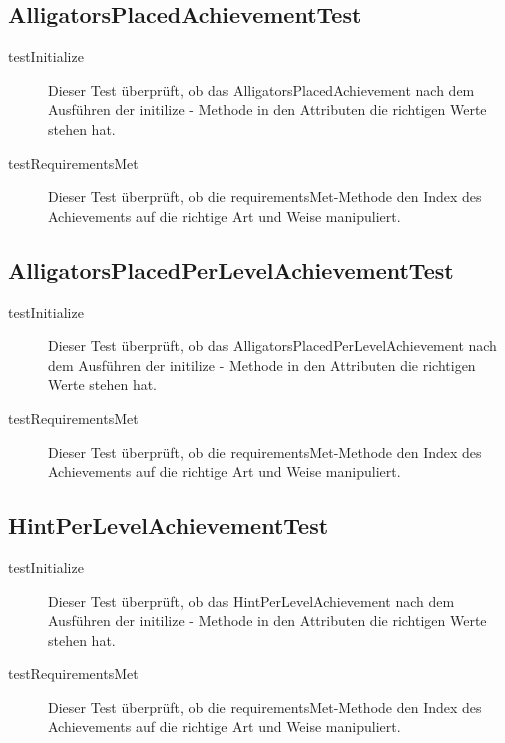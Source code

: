 \subsection{AlligatorsPlacedAchievementTest}

\begin{description}
\item[testInitialize]
Dieser Test überprüft, ob das AlligatorsPlacedAchievement nach dem Ausführen der initilize - Methode in den Attributen die richtigen Werte stehen hat.

\item[testRequirementsMet]
Dieser Test überprüft, ob die requirementsMet-Methode den Index des Achievements auf die richtige Art und Weise manipuliert.

\end{description}

\subsection{AlligatorsPlacedPerLevelAchievementTest}

\begin{description}
\item[testInitialize]
Dieser Test überprüft, ob das AlligatorsPlacedPerLevelAchievement nach dem Ausführen der initilize - Methode in den Attributen die richtigen Werte stehen hat.

\item[testRequirementsMet]
Dieser Test überprüft, ob die requirementsMet-Methode den Index des Achievements auf die richtige Art und Weise manipuliert.

\end{description}

\subsection{HintPerLevelAchievementTest}

\begin{description}
\item[testInitialize]
Dieser Test überprüft, ob das HintPerLevelAchievement nach dem Ausführen der initilize - Methode in den Attributen die richtigen Werte stehen hat.

\item[testRequirementsMet]
Dieser Test überprüft, ob die requirementsMet-Methode den Index des Achievements auf die richtige Art und Weise manipuliert.

\end{description}

